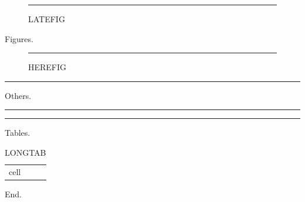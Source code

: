 \documentclass[a4paper]{article}
\begin{document}
\begin{figure}[p]
  \centering\rule{4cm}{4cm}\caption{LATEFIG}
\end{figure}
Figures. \lipsum[1][1-3]

\begin{figure}[H]
  \centering\rule{2cm}{5mm}\caption{HEREFIG}
\end{figure}
\clearpage
\begin{floatone}[p]
  \centering\rule{4cm}{4cm}\caption{LATEONE}
\end{floatone}
Others. \lipsum[2][1-3]

\begin{floatone}[H]
  \centering\rule{2cm}{5mm}\caption{HEREONE}
\end{floatone}
\clearpage
\begin{table}[p]
  \centering\rule{4cm}{4cm}\caption{LATETAB}
\end{table}
Tables. \lipsum[3][1-3]

\begin{longtable}{l}
  \caption{LONGTAB}\\
  cell\\
\end{longtable}
\clearpage
End.
\end{document}
